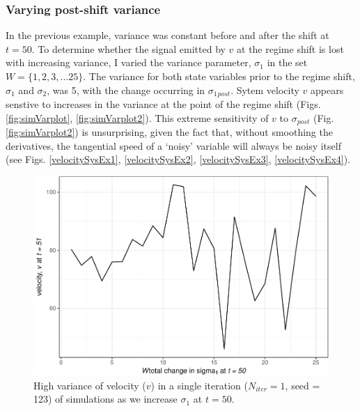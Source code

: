 \documentclass[12pt,twoside,openany]{reedthesis}
\begin{document}
\subsubsection{Varying post-shift
variance}\label{varying-post-shift-variance}

In the previous example, variance was constant before and after the
shift at \(t=50\). To determine whether the signal emitted by \(v\) at
the regime shift is lost with increasing variance, I varied the variance
parameter, \(\sigma_1\) in the set \(W = \{1,2,3,...25 \}\). The
variance for both state variables prior to the regime shift,
\(\sigma_1\) and \(\sigma_2\), was 5, with the change occurring in
\(\sigma_1{_{post}}\). Sytem velocity \(v\) appears senstive to
increases in the variance at the point of the regime shift (Figs.
\ref{fig:simVarplot}, \ref{fig:simVarplot2}). This extreme sensitivity
of \(v\) to \(\sigma{_{post}}\) (Fig. \ref{fig:simVarplot2}) is
unsurprising, given the fact that, without smoothing the derivatives,
the tangential speed of a `noisy' variable will always be noisy itself
(see Figs. \ref{velocitySysEx1}, \ref{velocitySysEx2},
\ref{velocitySysEx3}, \ref{velocitySysEx4}).
\begin{figure}
\centering
\includegraphics{_myDissertation_files/figure-latex/simVarPlot-1.pdf}
\caption{\label{fig:simVarPlot}High variance of velocity (\(v\)) in a single
iteration (\(N_{iter}=1\), seed = 123) of simulations as we increase
\(\sigma_1\) at \(t=50\).}
\end{figure}
\end{document}
